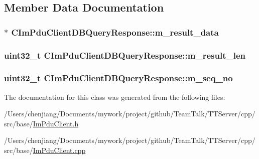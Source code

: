 \subsection{Member Data Documentation}
\hypertarget{class_c_im_pdu_client_d_b_query_response_ae7f49b7a08b6efe44cbc150d00da7841}{}
\subsubsection[{m\+\_\+result\+\_\+data}]{$\ast$ C\+Im\+Pdu\+Client\+D\+B\+Query\+Response\+::m\+\_\+result\+\_\+data\hspace{0.3cm}{\ttfamily [private]}}\label{class_c_im_pdu_client_d_b_query_response_ae7f49b7a08b6efe44cbc150d00da7841}
\hypertarget{class_c_im_pdu_client_d_b_query_response_adcdcb1084c57d42c9fa6d17c3b21c031}{}
\subsubsection[{m\+\_\+result\+\_\+len}]{\setlength{\rightskip}{0pt plus 5cm}uint32\+\_\+t C\+Im\+Pdu\+Client\+D\+B\+Query\+Response\+::m\+\_\+result\+\_\+len\hspace{0.3cm}{\ttfamily [private]}}\label{class_c_im_pdu_client_d_b_query_response_adcdcb1084c57d42c9fa6d17c3b21c031}
\hypertarget{class_c_im_pdu_client_d_b_query_response_acee05805a289d73e6d2f2432dddfdb23}{}
\subsubsection[{m\+\_\+seq\+\_\+no}]{\setlength{\rightskip}{0pt plus 5cm}uint32\+\_\+t C\+Im\+Pdu\+Client\+D\+B\+Query\+Response\+::m\+\_\+seq\+\_\+no\hspace{0.3cm}{\ttfamily [private]}}\label{class_c_im_pdu_client_d_b_query_response_acee05805a289d73e6d2f2432dddfdb23}


The documentation for this class was generated from the following files\+:\begin{DoxyCompactItemize}
\item 
/\+Users/chenjiang/\+Documents/mywork/project/github/\+Team\+Talk/\+T\+T\+Server/cpp/src/base/\hyperlink{_im_pdu_client_8h}{Im\+Pdu\+Client.\+h}\item 
/\+Users/chenjiang/\+Documents/mywork/project/github/\+Team\+Talk/\+T\+T\+Server/cpp/src/base/\hyperlink{_im_pdu_client_8cpp}{Im\+Pdu\+Client.\+cpp}\end{DoxyCompactItemize}
